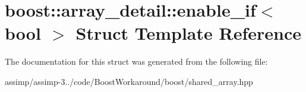 \hypertarget{structboost_1_1array__detail_1_1enable__if}{\section{boost\+:\+:array\+\_\+detail\+:\+:enable\+\_\+if$<$ bool $>$ Struct Template Reference}
\label{structboost_1_1array__detail_1_1enable__if}
}


The documentation for this struct was generated from the following file\+:\begin{DoxyCompactItemize}
\item 
assimp/assimp-\/3../code/\+Boost\+Workaround/boost/shared\+\_\+array.\+hpp\end{DoxyCompactItemize}
